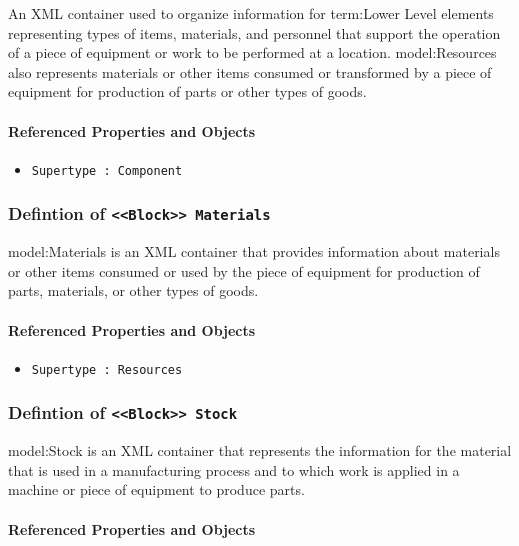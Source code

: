 An XML container used to organize information for {term:Lower Level} elements representing types of items, materials, and personnel that support the operation of a piece of equipment or work to be performed at a location. {model:Resources} also represents materials or other items consumed or transformed by a piece of equipment for production of parts or other types of goods.

\FloatBarrier
\paragraph{Referenced Properties and Objects}

\begin{itemize}
\item \texttt{Supertype : Component}

\end{itemize}
\FloatBarrier
\subsubsection{Defintion of \texttt{<<Block>> Materials}}
  \label{type:Materials}

\FloatBarrier

{model:Materials} is an XML container that provides information about materials or other items consumed or used by the piece of equipment for production of parts, materials, or other types of goods.

\FloatBarrier
\paragraph{Referenced Properties and Objects}

\begin{itemize}
\item \texttt{Supertype : Resources}

\end{itemize}
\FloatBarrier
\subsubsection{Defintion of \texttt{<<Block>> Stock}}
  \label{type:Stock}

\FloatBarrier

{model:Stock} is an XML container that represents the information for the material that is used in a manufacturing process and to which work is applied in a machine or piece of equipment to produce parts.

\FloatBarrier
\paragraph{Referenced Properties and Objects}

